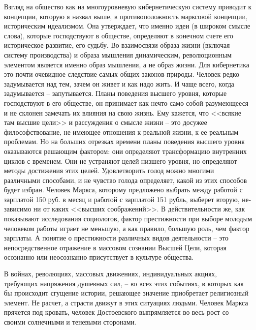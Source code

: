 \documentclass{book}
\begin{document}
Взгляд на общество как на многоуровневую кибернетиче­скую систему приводит к концепции, которую я назвал выше, в противоположность марксовой концепции, историческим идеализмом.  Она утверждает, что именно идеи  (в широком смысле слова), которые господствуют в обществе, определяют в конечном счете его историческое развитие, его судьбу. Во взаимосвязи образа жизни (включая систему производства) и образа мышления динамическим, революционным элемен­том является именно образ мышления, а не образ жизни. Для кибернетика это почти очевидное следствие самых общих зако­нов природы. Человек редко задумывается над тем, зачем он живет и как надо жить. И чаще всего, когда задумывается -- запутывается. Планы поведения высшего уровня, которые господствуют в его обществе, он принимает как нечто само собой разумеющееся и не склонен замечать их влияния на свою жизнь. Ему кажется, что <<всякие там высшие цели>> и рассуж­дения о смысле жизни -- это досужее философствование, не имеющее отношения к реальной жизни, к ее реальным 
пробле­мам. Но на больших отрезках времени планы поведения выс­шего уровня оказываются решающим фактором: они опреде­ляют трансформацию внутренних циклов с временем. Они не устраняют целей низшего уровня, но определяют методы до­стижения этих целей. Удовлетворить голод можно многими различными способами, и не  чувство голода определяет, ка­кой из этих способов будет избран. Человек Маркса, которо­му предложено выбрать между работой с зарплатой 150 руб. в месяц и работой с зарплатой 151 рубль, выберет вторую, не­зависимо ни от каких <<высших соображений>>. В действительности же, как показывают исследования социологов, фактор престижности при выборе молодым человеком работы играет не меньшую, а как правило, большую роль, чем фактор зарплаты. А понятие о престижности различных видов деятель­ности -- это непосредственное отражение в массовом сознании Высшей Цели, которая осознанно или неосознанно присутствует в культуре общества.

В войнах, революциях, массовых движениях, индивидуаль­ных акциях, требующих напряжения душевных сил, -- во всех этих событиях, в которых как бы происходит сгущение истории, решающее значение приобретает религиозный элемент. Не расчет, а страсти движут в этих ситуациях людьми. Человек Маркса прячется под кровать, человек Достоевского выпрямляется во весь рост со своими солнечными и теневыми сторонами.
\end{document}
